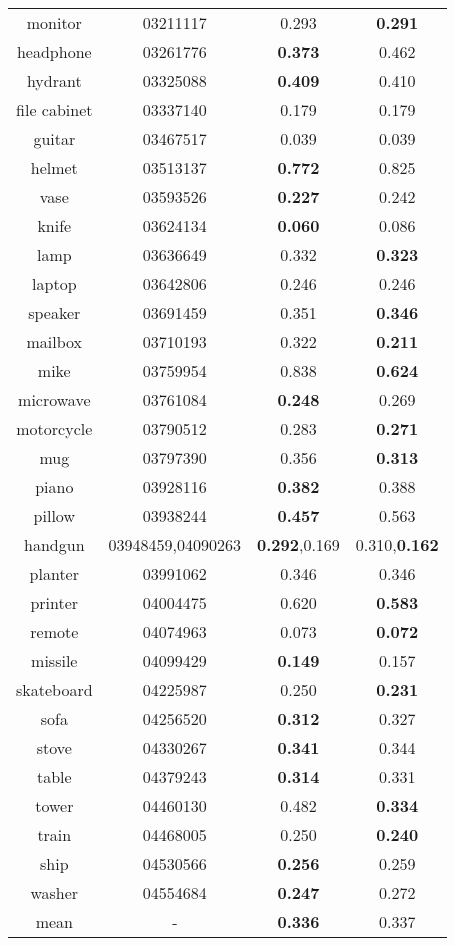 \begin{table}
\begin{tabular}{c c c c}
		monitor & 03211117 & 0.293 & {\color{green}\textbf{0.291}}\\
		headphone & 03261776 & {\color{green}\textbf{0.373}} & 0.462\\
		hydrant & 03325088 & {\color{green}\textbf{0.409}} & 0.410\\
		file cabinet& 03337140 & 0.179 & 0.179\\
		guitar & 03467517 & 0.039 & 0.039\\
		helmet & 03513137 & {\color{green}\textbf{0.772}} & 0.825\\
		vase & 03593526 & {\color{green}\textbf{0.227}} & 0.242\\
		knife & 03624134 & {\color{green}\textbf{0.060}}  & 0.086\\
		lamp & 03636649 & 0.332 & {\color{green}\textbf{0.323}}\\
		laptop & 03642806 & 0.246 & 0.246\\
		speaker & 03691459 & 0.351 & {\color{green}\textbf{0.346}}\\
		mailbox & 03710193 & 0.322 & {\color{green}\textbf{0.211}}\\
		mike & 03759954 & 0.838 & {\color{green}\textbf{0.624}}\\
		microwave & 03761084 & {\color{green}\textbf{0.248}} & 0.269\\
		motorcycle & 03790512 & 0.283 & {\color{green}\textbf{0.271}}\\
		mug & 03797390 & 0.356 & {\color{green}\textbf{0.313}}\\
		piano & 03928116 & {\color{green}\textbf{0.382}} & 0.388\\
		pillow & 03938244 & {\color{green}\textbf{0.457}} & 0.563\\
		handgun & 03948459,04090263 & {\color{green}\textbf{0.292}},0.169 & 0.310,{\color{green}\textbf{0.162}}\\
		planter & 03991062 & 0.346 & 0.346\\
		printer & 04004475 & 0.620 & {\color{green}\textbf{0.583}}\\
		remote & 04074963 & 0.073 & {\color{green}\textbf{0.072}}\\
		missile & 04099429 & {\color{green}\textbf{0.149}} & 0.157\\
		skateboard & 04225987 & 0.250 & {\color{green}\textbf{0.231}}\\
		sofa & 04256520 & {\color{green}\textbf{0.312}} & 0.327\\
		stove & 04330267 & {\color{green}\textbf{0.341}} & 0.344\\
		table & 04379243 & {\color{green}\textbf{0.314}} & 0.331\\
		tower & 04460130 & 0.482 & {\color{green}\textbf{0.334}}\\
		train & 04468005 & 0.250 & {\color{green}\textbf{0.240}}\\
		ship  & 04530566 & {\color{green}\textbf{0.256}} & 0.259\\
		washer &  04554684 & {\color{green}\textbf{0.247}} & 0.272\\
		mean   &     -     & {\color{green}\textbf{0.336}} & 0.337
	\end{tabular}
\end{table}

